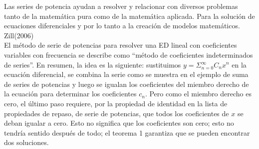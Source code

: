\documentclass[12pt,letterpaper,oneside]{article}
\begin{document}
 Las series de potencia ayudan a resolver y relacionar con diversos problemas tanto de la matemática pura como de la matemática aplicada. Para la solución de ecuaciones diferenciales y por lo tanto a la creación de modelos matemáticos. Zill(2006)\vspace{1.0cm}\\
El método de serie de potencias para resolver una ED lineal con coeficientes variables con frecuencia se describe como “método de coeficientes indeterminados de series”. En resumen, la idea es la siguiente: sustituimos $y = \Sigma{^\infty_{n=0}}C_nx^n$ en la ecuación diferencial, se combina la serie como se muestra en el ejemplo de suma de series de potencias  y luego se igualan los coeficientes del miembro derecho de la ecuación para determinar los coeficientes $c_n$. Pero como el miembro derecho es cero, el último paso requiere, por la propiedad de identidad en la lista de propiedades de repaso, de serie de potencias, que todos los coeficientes de $x$ se deban igualar a cero. Esto no
significa que los coeficientes son cero; esto no tendría sentido después de todo; el teorema 1 garantiza que se pueden encontrar dos soluciones.
\end{document}
